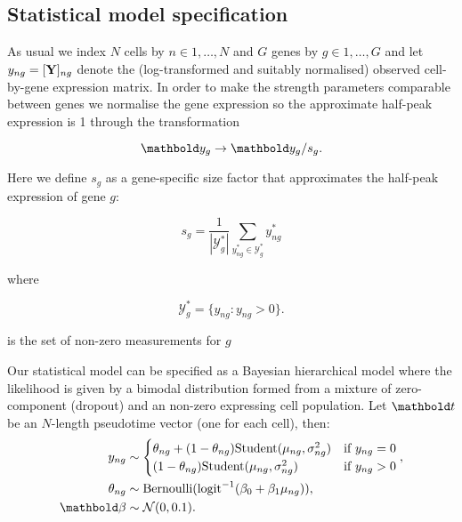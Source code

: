 \subsection{Statistical model specification}


As usual we index $N$ cells by $n \in 1, \ldots, N$ and $G$ genes by $g \in 1, \ldots, G$ and let $y_{ng} = [{\bf Y}]_{ng}$ denote the (log-transformed and suitably normalised) observed cell-by-gene expression matrix. In order to make the strength parameters comparable between genes we normalise the gene expression so the approximate half-peak expression is 1 through the transformation

\begin{equation}
\mby_g \rightarrow \mby_g / s_g.
\end{equation}

Here we define $s_g$ as a gene-specific size factor that approximates the half-peak expression of gene $g$:

\begin{equation}
s_g = \frac{1}{|\mathcal{Y}_g^*|} \sum_{y_{ng}^* \in \mathcal{Y}_g^*} y_{ng}^*
\end{equation}

where

\begin{equation}
\mathcal{Y}_g^* = \{ y_{ng} : y_{ng} > 0 \}.
\end{equation}

is the set of non-zero measurements for $g$

Our statistical model can be specified as a Bayesian hierarchical model where the likelihood is given by a bimodal distribution formed from a mixture of zero-component (dropout) and an non-zero expressing cell population. Let $\mbt$ be an $N$-length pseudotime vector (one for each cell), then:
\begin{align}
		y_{ng} & \sim \begin{cases}
		\theta_{ng} + (1 - \theta_{ng}) \mathrm{Student}(\mu_{ng}, \sigma^2_{ng}) & \mbox{if } y_{ng} = 0 \\
		 (1 - \theta_{ng}) \mathrm{Student}(\mu_{ng}, \sigma^2_{ng}) & \mbox{if } y_{ng} > 0
		\end{cases}, \\
		\theta_{ng} & \sim \mathrm{Bernoulli}(\mathrm{logit}^{-1} (\beta_0 + \beta_1 \mu_{ng})), \\
		\mbbeta & \sim \norm(0, 0.1) .
\end{align}

